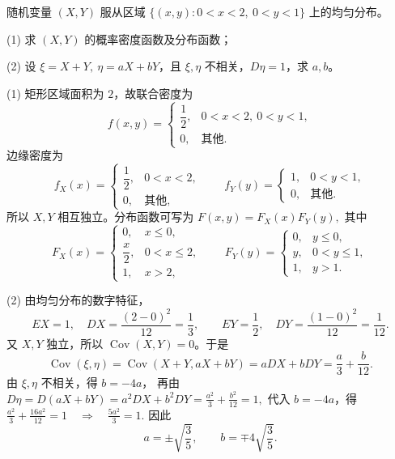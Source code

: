 \documentclass[lang=cn,11pt]{elegantbook}
\begin{document}
\begin{exercise}\label{exer:src-2008-probstat-2a-vii-01}
随机变量 \((X,Y)\) 服从区域
\(
\{(x,y):0<x<2,\ 0<y<1\}
\)
上的均匀分布。\par
(1) 求 \((X,Y)\) 的概率密度函数及分布函数；\par
(2) 设 \(\xi=X+Y,\ \eta=aX+bY\)，且 \(\xi,\eta\) 不相关，\(D\eta=1\)，求 \(a,b\)。
\end{exercise}
\begin{solution}
(1) 矩形区域面积为 \(2\)，故联合密度为
\[
f(x,y)=
\begin{cases}
\dfrac12,&0<x<2,\ 0<y<1,\\
0,&\text{其他}.
\end{cases}
\]
边缘密度为
\[
f_X(x)=
\begin{cases}
\dfrac12,&0<x<2,\\
0,&\text{其他},
\end{cases}
\qquad
f_Y(y)=
\begin{cases}
1,&0<y<1,\\
0,&\text{其他}.
\end{cases}
\]
所以 \(X,Y\) 相互独立。分布函数可写为
\(
F(x,y)=F_X(x)F_Y(y),
\)
其中
\[
F_X(x)=
\begin{cases}
0,&x\le0,\\
\dfrac{x}{2},&0<x\le2,\\
1,&x>2,
\end{cases}
\qquad
F_Y(y)=
\begin{cases}
0,&y\le0,\\
y,&0<y\le1,\\
1,&y>1.
\end{cases}
\]

(2) 由均匀分布的数字特征，
\[
EX=1,\quad DX=\frac{(2-0)^2}{12}=\frac13,\qquad
EY=\frac12,\quad DY=\frac{(1-0)^2}{12}=\frac1{12}.
\]
又 \(X,Y\) 独立，所以 \(\operatorname{Cov}(X,Y)=0\)。于是
\[
\operatorname{Cov}(\xi,\eta)
=\operatorname{Cov}(X+Y,aX+bY)
=aDX+bDY
=\frac a3+\frac b{12}.
\]
由 \(\xi,\eta\) 不相关，得
\(
b=-4a
\)，
再由
\(
D\eta=D(aX+bY)=a^2DX+b^2DY=\frac{a^2}{3}+\frac{b^2}{12}=1,
\)
代入 \(b=-4a\)，得
\(
\frac{a^2}{3}+\frac{16a^2}{12}=1
\quad\Longrightarrow\quad
\frac{5a^2}{3}=1.
\)
因此
\[
a=\pm\sqrt{\frac35},\qquad b=\mp4\sqrt{\frac35}.
\]
\end{solution}
\end{document}
